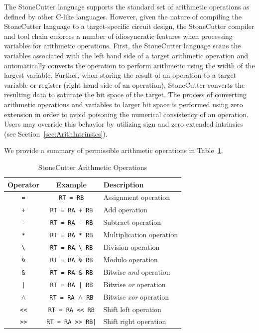 \documentclass{article}
\begin{document}
The StoneCutter language supports the standard set of arithmetic operations as defined 
by other C-like languages.  However, given the nature of compiling the StoneCutter language 
to a target-specific circuit design, the StoneCutter compiler and tool chain enforces a number 
of idiosyncratic features when processing variables for arithmetic operations.  First, the StoneCutter 
language scans the variables associated with the left hand side of a target arithmetic operation and automatically 
converts the operation to perform arithmetic using the width of the largest variable.  Further, when 
storing the result of an operation to a target variable or register (right hand side of an operation), StoneCutter 
converts the resulting data to saturate the bit space of the target.  The process of converting 
arithmetic operations and variables to larger bit space is performed using zero extension in order to avoid 
poisoning the numerical consistency of an operation.  Users may override this behavior by utilizing 
sign and zero extended intrinsics (see Section~\ref{sec:ArithIntrinsics}).

We provide a summary of permissible arithmetic operations in Table~\ref{tab:arithops}.   

\begin{table}[h]
\begin{center}
\caption{StoneCutter Arithmetic Operations}
\vspace{0.125in}
\label{tab:arithops}
\begin{tabular}{|c|c|l|}
\hline
\textbf{Operator} & \textbf{Example} & \textbf{Description}\\
\hline
\texttt{=} & \texttt{RT = RB} & Assignment operation\\
\hline
\texttt{+} & \texttt{RT = RA + RB} & Add operation\\
\hline
\texttt{-} & \texttt{RT = RA - RB} & Subtract operation\\
\hline
\texttt{*} & \texttt{RT = RA * RB} & Multiplication operation\\
\hline
\texttt{\textbackslash} & \texttt{RT = RA \textbackslash~RB} & Division operation\\
\hline
\texttt{\%} & \texttt{RT = RA \% RB} & Modulo operation\\
\hline
\texttt{\&} & \texttt{RT = RA \& RB} & Bitwise \textit{and} operation\\
\hline
\texttt{|} & \texttt{RT = RA | RB} & Bitwise \textit{or} operation\\
\hline
\texttt{$\wedge$} & \texttt{RT = RA $\wedge$ RB} & Bitwise \textit{xor} operation\\
\hline
\texttt{<<} & \texttt{RT = RA << RB} & Shift left operation\\
\hline
\texttt{>>} & \texttt{RT = RA >> RB|} & Shift right operation\\
\hline
\end{tabular}
\end{center}
\end{table}
\end{document}
